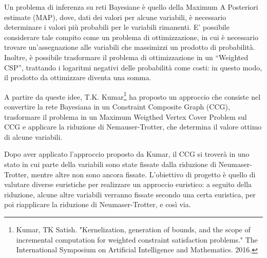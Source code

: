 Un problema di inferenza su reti Bayesiane è quello della Maximum A Posteriori estimate (MAP), dove, dati dei valori per alcune variabili, è necessario determinare i valori più probabili per le variabili rimanenti. E' possibile considerare tale compito come un problema di ottimizzazione, in cui è necessario trovare un'assegnazione alle variabili che massimizzi un prodotto di probabilità. Inoltre, è possibile trasformare il problema di ottimizzazione in un ``Weighted CSP'', trattando i logaritmi negativi delle probabilità come costi: in questo modo, il prodotto da ottimizzare diventa una somma.

A partire da queste idee, T.K. Kumar\footnote{Kumar, TK Satish. "Kernelization, generation of bounds, and the scope of incremental computation for weighted constraint satisfaction problems." The International Symposium on Artificial Intelligence and Mathematics. 2016.} ha proposto un approccio che consiste nel convertire la rete Bayesiana in un Constraint Composite Graph (CCG), trasformare il problema in un Maximum Weigthed Vertex Cover Problem sul CCG e applicare la riduzione di Nemauser-Trotter, che determina il valore ottimo di alcune variabili.

Dopo aver applicato l'approccio proposto da Kumar, il CCG si troverà in uno stato in cui parte della variabili sono state fissate dalla riduzione di Neumaser-Trotter, mentre altre non sono ancora fissate. L'obiettivo di progetto è quello di valutare diverse euristiche per realizzare un approccio euristico: a seguito della riduzione, alcune altre variabili verranno fissate secondo una certa euristica, per poi riapplicare la riduzione di Neumaser-Trotter, e così via. 